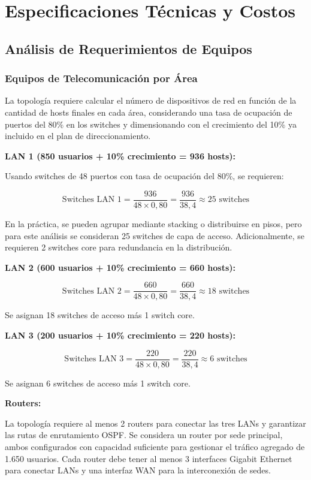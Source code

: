 \section{Especificaciones Técnicas y Costos}

\subsection{Análisis de Requerimientos de Equipos}

\subsubsection{Equipos de Telecomunicación por Área}

La topología requiere calcular el número de dispositivos de red en función de
la cantidad de hosts finales en cada área, considerando una tasa de ocupación
de puertos del 80\% en los switches y dimensionando con el crecimiento del
10\% ya incluido en el plan de direccionamiento.

\textbf{LAN 1 (850 usuarios + 10\% crecimiento = 936 hosts):}

Usando switches de 48 puertos con tasa de ocupación del 80\%, se requieren:

\[
\text{Switches LAN 1} = \frac{936}{48 \times 0{,}80} = \frac{936}{38{,}4}
\approx 25 \text{ switches}
\]

En la práctica, se pueden agrupar mediante stacking o distribuirse en pisos,
pero para este análisis se consideran 25 switches de capa de acceso.
Adicionalmente, se requieren 2 switches core para redundancia en la
distribución.

\textbf{LAN 2 (600 usuarios + 10\% crecimiento = 660 hosts):}

\[
\text{Switches LAN 2} = \frac{660}{48 \times 0{,}80} = \frac{660}{38{,}4}
\approx 18 \text{ switches}
\]

Se asignan 18 switches de acceso más 1 switch core.

\textbf{LAN 3 (200 usuarios + 10\% crecimiento = 220 hosts):}

\[
\text{Switches LAN 3} = \frac{220}{48 \times 0{,}80} = \frac{220}{38{,}4}
\approx 6 \text{ switches}
\]

Se asignan 6 switches de acceso más 1 switch core.

\textbf{Routers:}

La topología requiere al menos 2 routers para conectar las tres LANs y
garantizar las rutas de enrutamiento OSPF. Se considera un router por sede
principal, ambos configurados con capacidad suficiente para gestionar el
tráfico agregado de 1.650 usuarios. Cada router debe tener al menos 3
interfaces Gigabit Ethernet para conectar LANs y una interfaz WAN para la
interconexión de sedes.

